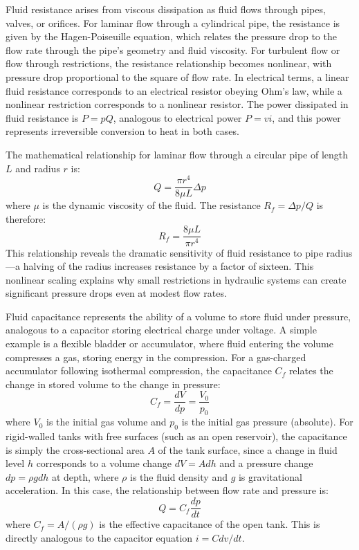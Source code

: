 Fluid resistance arises from viscous dissipation as fluid flows through pipes, valves, or orifices. For laminar flow through a cylindrical pipe, the resistance is given by the Hagen-Poiseuille equation, which relates the pressure drop to the flow rate through the pipe's geometry and fluid viscosity. For turbulent flow or flow through restrictions, the resistance relationship becomes nonlinear, with pressure drop proportional to the square of flow rate. In electrical terms, a linear fluid resistance corresponds to an electrical resistor obeying Ohm's law, while a nonlinear restriction corresponds to a nonlinear resistor. The power dissipated in fluid resistance is $P = p Q$, analogous to electrical power $P = v i$, and this power represents irreversible conversion to heat in both cases.

The mathematical relationship for laminar flow through a circular pipe of length $L$ and radius $r$ is:
\begin{equation}
Q = \frac{\pi r^4}{8\mu L} \Delta p
\end{equation}
where $\mu$ is the dynamic viscosity of the fluid. The resistance $R_f = \Delta p / Q$ is therefore:
\begin{equation}
R_f = \frac{8\mu L}{\pi r^4}
\end{equation}
This relationship reveals the dramatic sensitivity of fluid resistance to pipe radius—a halving of the radius increases resistance by a factor of sixteen. This nonlinear scaling explains why small restrictions in hydraulic systems can create significant pressure drops even at modest flow rates.

Fluid capacitance represents the ability of a volume to store fluid under pressure, analogous to a capacitor storing electrical charge under voltage. A simple example is a flexible bladder or accumulator, where fluid entering the volume compresses a gas, storing energy in the compression. For a gas-charged accumulator following isothermal compression, the capacitance $C_f$ relates the change in stored volume to the change in pressure:
\begin{equation}
C_f = \frac{dV}{dp} = \frac{V_0}{p_0}
\end{equation}
where $V_0$ is the initial gas volume and $p_0$ is the initial gas pressure (absolute). For rigid-walled tanks with free surfaces (such as an open reservoir), the capacitance is simply the cross-sectional area $A$ of the tank surface, since a change in fluid level $h$ corresponds to a volume change $dV = A dh$ and a pressure change $dp = \rho g dh$ at depth, where $\rho$ is the fluid density and $g$ is gravitational acceleration. In this case, the relationship between flow rate and pressure is:
\begin{equation}
Q = C_f \frac{dp}{dt}
\end{equation}
where $C_f = A / (\rho g)$ is the effective capacitance of the open tank. This is directly analogous to the capacitor equation $i = C dv/dt$.

